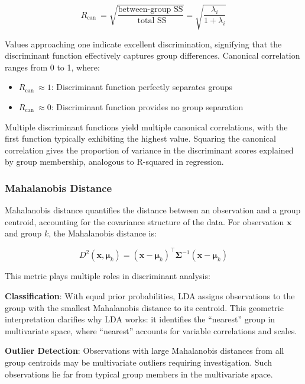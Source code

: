 \documentclass[
]{article}
\begin{document}
\[R_{\text{can }} = \sqrt{\frac{\text{between-group SS}}{\text{ total SS}}} = \sqrt{\frac{\lambda_{i}}{1 + \lambda_{i}}}\]

Values approaching one indicate excellent discrimination, signifying
that the discriminant function effectively captures group differences.
Canonical correlation ranges from 0 to 1, where:

\begin{itemize}
\item
  \(R_{\text{can }} \approx 1\): Discriminant function perfectly
  separates groups
\item
  \(R_{\text{can }} \approx 0\): Discriminant function provides no group
  separation
\end{itemize}

Multiple discriminant functions yield multiple canonical correlations,
with the first function typically exhibiting the highest value. Squaring
the canonical correlation gives the proportion of variance in the
discriminant scores explained by group membership, analogous to
R-squared in regression.

\subsubsection{Mahalanobis Distance}

Mahalanobis distance quantifies the distance between an observation and
a group centroid, accounting for the covariance structure of the data.
For observation \(\mathbf{x}\) and group \(k\), the Mahalanobis distance
is:

\[D^{2}\left( \mathbf{x},\mathbf{\mu}_{k} \right) = \left( \mathbf{x} - \mathbf{\mu}_{k} \right)^{\top}\mathbf{\Sigma}^{- 1}\left( \mathbf{x} - \mathbf{\mu}_{k} \right)\]

This metric plays multiple roles in discriminant analysis:

\textbf{Classification}: With equal prior probabilities, LDA assigns
observations to the group with the smallest Mahalanobis distance to its
centroid. This geometric interpretation clarifies why LDA works: it
identifies the ``nearest'' group in multivariate space, where
``nearest'' accounts for variable correlations and scales.

\textbf{Outlier Detection}: Observations with large Mahalanobis
distances from all group centroids may be multivariate outliers
requiring investigation. Such observations lie far from typical group
members in the multivariate space.
\end{document}
